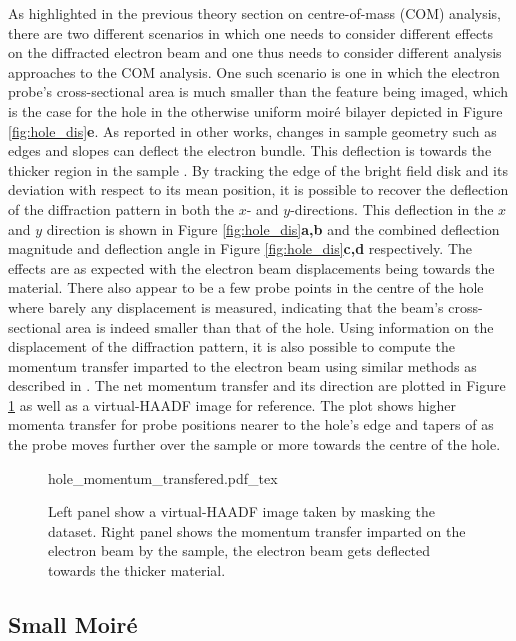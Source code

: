 As highlighted in the previous theory section on centre-of-mass (COM) analysis, there are two different scenarios in which one needs to consider different effects on the diffracted electron beam and one thus needs to consider different analysis approaches to the COM analysis. One such scenario is one in which the electron probe's cross-sectional area is much smaller than the feature being imaged, which is the case for the hole in the otherwise uniform moiré bilayer depicted in Figure \ref{fig:hole_dis}\textbf{e}. As reported in other works, changes in sample geometry such as edges and slopes can deflect the electron bundle. This deflection is towards the thicker region in the sample \cite{ophusFourDimensionalScanningTransmission2019a,dekkers1974differential}. By tracking the edge of the bright field disk and its deviation with respect to its mean position, it is possible to recover the deflection of the diffraction pattern in both the $x$- and $y$-directions. This deflection in the $x$ and $y$ direction is shown in Figure \ref{fig:hole_dis}\textbf{a,b} and the combined deflection magnitude and deflection angle in Figure \ref{fig:hole_dis}\textbf{c,d} respectively. The effects are as expected with the electron beam displacements being towards the material. There also appear to be a few probe points in the centre of the hole where barely any displacement is measured, indicating that the beam's cross-sectional area is indeed smaller than that of the hole. Using information on the displacement of the diffraction pattern, it is also possible to compute the momentum transfer imparted to the electron beam using similar methods as described in \cite{mullerAtomicElectricFields2014}. The net momentum transfer and its direction are plotted in Figure \ref{fig:hole_mom} as well as a virtual-HAADF image for reference. The plot shows higher momenta transfer for probe positions nearer to the hole's edge and tapers of as the probe moves further over the sample or more towards the centre of the hole.

\begin{figure}
    \centering
    \def\svgwidth{.7\linewidth}
    {hole_momentum_transfered.pdf_tex}
    \caption{Left panel show a virtual-HAADF image taken by masking the dataset. Right panel shows the momentum transfer imparted on the electron beam by the sample, the electron beam gets deflected towards the thicker material.}
    \label{fig:hole_mom}
\end{figure}

\subsection{Small Moiré}


